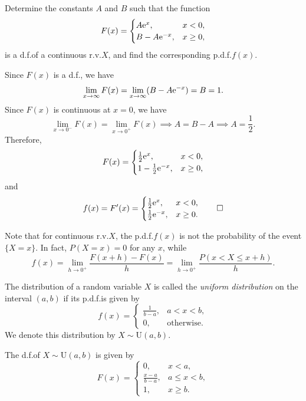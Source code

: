 \begin{example}
  Determine the constants \(A\) and \(B\) such that the function
  \[
    F(x) = \begin{cases}
      A \mathrm{e}^{x}, & x < 0, \\
      B - A \mathrm{e}^{-x}, & x \geq 0,
    \end{cases}
  \]
  is a d.f.\@ of a continuous r.v.\@ \(X\), and find the corresponding p.d.f.\@ \(f(x)\).
\end{example}

\begin{solution}
  Since \(F(x)\) is a d.f.\@, we have
  \[
    \lim_{x \to \infty} F(x) = \lim_{x \to \infty} (B - A \mathrm{e}^{-x}) = B = 1.
  \]
  Since \(F(x)\) is continuous at \(x = 0\), we have
  \[
    \lim_{x \to 0^-} F(x) = \lim_{x \to 0^+} F(x) \implies A = B - A \implies A = \frac{1}{2}.
  \]
  Therefore,
  \[
    F(x) = \begin{cases}
      \frac{1}{2} \mathrm{e}^{x}, & x < 0, \\
      1 - \frac{1}{2} \mathrm{e}^{-x}, & x \geq 0,
    \end{cases}
  \]
  and
  \[
    f(x) = F'(x) = \begin{cases}
      \frac{1}{2} \mathrm{e}^{x}, & x < 0, \\
      \frac{1}{2} \mathrm{e}^{-x}, & x \geq 0.
    \end{cases} \qedhere
  \]
\end{solution}

\begin{remark}
  Note that for continuous r.v.\@ \(X\), the p.d.f.\@ \(f(x)\) is not the probability of the event \(\{X = x\}\). In fact, \(P(X = x) = 0\) for any \(x\), while
  \[
    f(x) = \lim_{h \to 0^+} \frac{F(x + h) - F(x)}{h} = \lim_{h \to 0^+} \frac{P(x < X \leq x + h)}{h}.
  \]
\end{remark}

\begin{definition}
  The distribution of a random variable \(X\) is called the \emph{uniform distribution} on the interval \((a, b)\) if its p.d.f.\@ is given by
  \[
    f(x) = \begin{cases}
      \frac{1}{b - a}, & a < x < b, \\
      0, & \text{otherwise}.
    \end{cases}
  \]
  We denote this distribution by \(X \sim \mathrm{U}(a, b)\).
\end{definition}

The d.f.\@ of \(X \sim \mathrm{U}(a, b)\) is given by
\[
  F(x) = \begin{cases}
    0, & x < a, \\
    \frac{x - a}{b - a}, & a \leq x < b, \\
    1, & x \geq b.
  \end{cases}
\]

